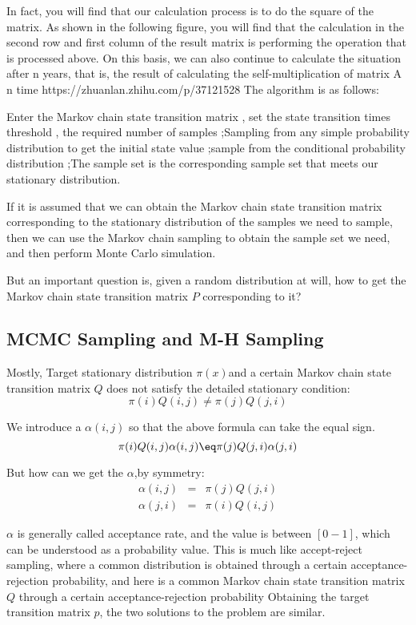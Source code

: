 In fact, you will find that our calculation process is to do the square of the matrix. As shown in the following figure, you will find that the calculation in the second row and first column of the result matrix is ​​performing the operation that is processed above. On this basis, we can also continue to calculate the situation after n years, that is, the result of calculating the self-multiplication of matrix A n time
https://zhuanlan.zhihu.com/p/37121528
The algorithm is as follows:

Enter the Markov chain state transition matrix , set the state transition times threshold , the required number of samples ;Sampling from any simple probability distribution to get the initial state value ;sample  from the conditional probability distribution ;The sample set is the corresponding sample set that meets our stationary distribution.


If it is assumed that we can obtain the Markov chain state transition matrix corresponding to the stationary distribution of the samples we need to sample, then we can use the Markov chain sampling to obtain the sample set we need, and then perform Monte Carlo simulation.

But an important question is, given a random distribution at will, how to get the Markov chain state transition matrix $P$ corresponding to it?

\subsection{MCMC Sampling and M-H Sampling}
Mostly,
Target stationary distribution $\pi(x)$and a certain Markov chain state transition matrix $Q$ does not satisfy the detailed stationary condition:
\[
  \pi(i)Q(i,j) \neq \pi(j)Q(j,i)
\]


We introduce a $\alpha(i,j)$ so that the above formula can take the equal sign.
\[
  \pi(i)Q(i,j)\alpha(i,j) \eq \pi(j)Q(j,i)\alpha(j,i)
\]

But how can we get the $\alpha$,by symmetry:
\begin{eqnarray*}
\alpha(i,j) &=& \pi(j)Q(j,i)\\
\alpha(j,i) &=& \pi(i)Q(i,j)
\end{eqnarray*}


$\alpha$ is generally called acceptance rate, and the value is between $[0-1]$, which can be understood as a probability value. This is much like accept-reject sampling, where a common distribution is obtained through a certain acceptance-rejection probability, and here is a common Markov chain state transition matrix $Q$ through a certain acceptance-rejection probability Obtaining the target transition matrix $p$, the two solutions to the problem are similar.

